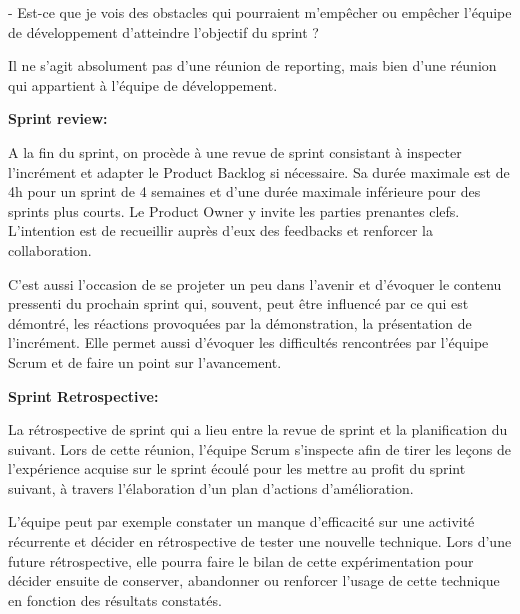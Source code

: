\documentclass[a4paper, 12pt]{report}
\begin{document}
\begin{itemize}
- Est-ce que je vois des obstacles qui pourraient m'empêcher ou empêcher l'équipe de développement d'atteindre l'objectif du sprint ? 

Il ne s'agit absolument pas d'une réunion de reporting, mais bien d’une réunion qui appartient à l'équipe de développement. 

\textbf{Sprint review:} 

A la fin du sprint, on procède à une revue de sprint consistant à inspecter l’incrément et adapter le Product Backlog si nécessaire. Sa durée maximale est de 4h pour un sprint de 4 semaines et d’une durée maximale inférieure pour des sprints plus courts. Le Product Owner y invite les parties prenantes clefs. L’intention est de recueillir auprès d’eux des feedbacks et renforcer la collaboration.  

C'est aussi l'occasion de se projeter un peu dans l'avenir et d'évoquer le contenu pressenti du prochain sprint qui, souvent, peut être influencé par ce qui est démontré, les réactions provoquées par la démonstration, la présentation de l'incrément. Elle permet aussi d'évoquer les difficultés rencontrées par l’équipe Scrum et de faire un point sur l'avancement. 

 

\textbf{Sprint Retrospective:} 

La rétrospective de sprint qui a lieu entre la revue de sprint et la planification du suivant. Lors de cette réunion, l’équipe Scrum s’inspecte afin de tirer les leçons de l’expérience acquise sur le sprint écoulé pour les mettre au profit du sprint suivant, à travers l’élaboration d’un plan d’actions d’amélioration. 

L’équipe peut par exemple constater un manque d’efficacité sur une activité récurrente et décider en rétrospective de tester une nouvelle technique. Lors d’une future rétrospective, elle pourra faire le bilan de cette expérimentation pour décider ensuite de conserver, abandonner ou renforcer l’usage de cette technique en fonction des résultats constatés. 


\end{itemize}
\end{document}
